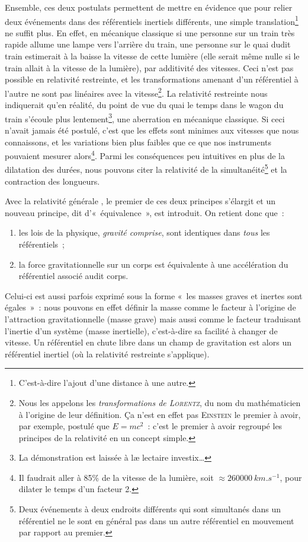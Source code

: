 \documentclass[../main/main.tex]{subfiles}
\begin{document}
Ensemble, ces deux postulats permettent de mettre en évidence que pour relier
deux événements dans des référentiels inertiels différents, une simple
translation\footnote{C'est-à-dire l'ajout d'une distance à une autre.} ne suffit
plus. En effet, en mécanique classique si une personne sur un train très rapide
allume une lampe vers l'arrière du train, une personne sur le quai dudit train
estimerait à la baisse la vitesse de cette lumière (elle serait même nulle si le
train allait à la vitesse de la lumière), par additivité des vitesses. Ceci
n'est pas possible en relativité restreinte, et les transformations amenant d'un
référentiel à l'autre ne sont pas linéaires avec la vitesse\footnote{Nous les
    appelons les \textit{transformations de \textsc{Lorentz}}, du nom du
    mathématicien à l'origine de leur définition. Ça n'est en effet pas
    \textsc{Einstein} le premier à avoir, par exemple, postulé que $E = mc^2$~:
    c'est le premier à avoir regroupé les principes de la relativité en un
concept simple.}. La relativité restreinte nous indiquerait qu'en réalité, du
point de vue du quai le temps dans le wagon du train s'écoule plus
lentement\footnote{La démonstration est laissée à læ lectaire investix…},
une aberration en mécanique classique. Si ceci n'avait jamais été postulé,
c'est que les effets sont minimes aux vitesses que nous connaissons, et les
variations bien plus faibles que ce que nos instruments pouvaient mesurer
alors\footnote{Il faudrait aller à 85\% de la vitesse de la lumière, soit
    $\approx \SI{260000}{km.s^{-1}}$, pour
dilater le temps d'un facteur 2.}. Parmi les conséquences peu intuitives en
plus de la dilatation des durées, nous pouvons citer la relativité de la
simultanéité\footnote{Deux événements à deux endroits différents qui sont
    simultanés dans un référentiel ne le sont en général pas dans un autre
référentiel en mouvement par rapport au premier.} et la contraction des
longueurs.

Avec la relativité générale \citep{einstein1915}, le premier de ces deux
principes s'élargit et un nouveau principe, dit d'«~équivalence~», est
introduit. On retient donc que~:
\begin{enumerate}
    \item les lois de la physique, \textit{gravité comprise}, sont identiques
      dans \textit{tous} les référentiels~;
    \item la force gravitationnelle sur un corps est équivalente à une
        accélération du référentiel associé audit corps.
\end{enumerate}
Celui-ci est aussi parfois exprimé sous la forme «~les masses graves et inertes
sont égales~»~: nous pouvons en effet définir la masse comme le facteur à
l'origine de l'attraction gravitationnelle (masse grave) mais aussi comme le
facteur traduisant l'inertie d'un système (masse inertielle), c'est-à-dire sa
facilité à changer de vitesse. Un référentiel en chute libre dans un champ de
gravitation est alors un référentiel inertiel (où la relativité restreinte
s'applique).
\end{document}

